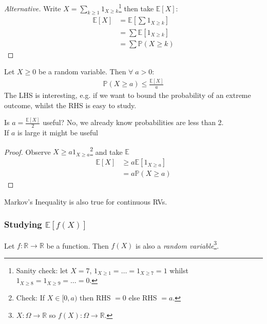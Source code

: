 \begin{proof}[Alternative]
    Write $X = \sum_{k \geq 1} 1_{X \geq k}$\footnote{Sanity check: let $X = 7$, $1_{X \geq 1} = \dots = 1_{X \geq 7} = 1$ whilst $1_{X \geq 8} = 1_{X \geq 9} = \dots = 0$.} then take $\mathbb{E}[X]$:
    \begin{align*}
        \mathbb{E}[X] &= \mathbb{E}\left[\sum 1_{X \geq k}\right] \\
        &= \sum \mathbb{E}[1_{X \geq k}] \\
        &= \sum \mathbb{P}(X \geq k)
    \end{align*} 
\end{proof} 

\begin{claim} \label{clm:markov}
    Let $X \geq 0$ be a random variable.
    Then $\forall \; a > 0$:
    \begin{align*}
        \mathbb{P}(X \geq a) \leq \frac{\mathbb{E}[X]}{a}
    \end{align*} 
    \color{red} The LHS is interesting, e.g. if we want to bound the probability of an extreme outcome, whilst the RHS is easy to study.
\end{claim}

\begin{note} \color{blue}
    Is $a = \frac{\mathbb{E}[X]}{2}$ useful? No, we already know probabilities are less than 2. \\
    If $a$ is large it might be useful
\end{note} 

\begin{proof}
    Observe $X \geq a 1_{X \geq a}$\footnote{Check: If $X \in [0, a)$ then RHS $= 0$ else RHS $= a$.} and take $\mathbb{E}$
    \begin{align*}
        \mathbb{E}[X] &\geq a \mathbb{E}[1_{X \geq a}] \\
        &= a \mathbb{P}(X \geq a)
    \end{align*} 
\end{proof} 

\begin{note} \color{red}
    Markov's Inequality is also true for continuous RVs.
\end{note} 

\subsubsection{Studying $\mathbb{E}[f(X)]$}
Let $f: \mathbb{R} \to \mathbb{R}$ be a function.
Then $f(X)$ is also a \emph{random variable}\footnote{\color{blue} $X: \Omega \to \mathbb{R}$ so $f(X) : \Omega \to \mathbb{R}$.}.

